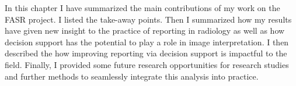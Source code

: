 In this chapter I have summarized the main contributions of my work on the FASR project. I listed the take-away points. Then I summarized how my results have given new insight to the practice of reporting in radiology as well as how decision support has the potential to play a role in image interpretation. I then described the how improving reporting via decision support is impactful to the field. Finally, I provided some future research opportunities for research studies and further methods to seamlessly integrate this analysis into practice.